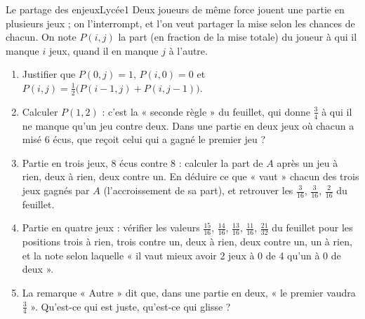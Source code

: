 \documentclass[11pt,a4paper]{article}
\begin{document}
\begin{exercice}{Le partage des enjeux}{Lycée}{1}
Deux joueurs de même force jouent une partie en plusieurs jeux ; on l'interrompt,
et l'on veut partager la mise selon les chances de chacun. On note $P(i,j)$ la
part (en fraction de la mise totale) du joueur à qui il manque $i$ jeux, quand il
en manque $j$ à l'autre.
\begin{enumerate}
\item Justifier que $P(0,j) = 1$, $P(i,0) = 0$ et
  $P(i,j) = \frac12\bigl(P(i-1,j) + P(i,j-1)\bigr)$.
\item Calculer $P(1,2)$ : c'est la « seconde règle » du feuillet, qui donne
  $\frac34$ à qui il ne manque qu'un jeu contre deux. Dans une partie en deux jeux
  où chacun a misé $6$ écus, que reçoit celui qui a gagné le premier jeu ?
\item Partie en trois jeux, $8$ écus contre $8$ : calculer la part de $A$ après
  un jeu à rien, deux à rien, deux contre un. En déduire ce que « vaut » chacun
  des trois jeux gagnés par $A$ (l'accroissement de sa part), et retrouver les
  $\frac{3}{16}$, $\frac{3}{16}$, $\frac{2}{16}$ du feuillet.
\item Partie en quatre jeux : vérifier les valeurs $\frac{15}{16}$, $\frac{14}{16}$,
  $\frac{13}{16}$, $\frac{11}{16}$, $\frac{21}{32}$ du feuillet pour les positions
  trois à rien, trois contre un, deux à rien, deux contre un, un à rien, et la
  note selon laquelle « il vaut mieux avoir 2 jeux à 0 de 4 qu'un à 0 de deux ».
\item La remarque « Autre » dit que, dans une partie en deux, « le premier vaudra
  $\frac34$ ». Qu'est-ce qui est juste, qu'est-ce qui glisse ?
\end{enumerate}
\end{exercice}
\end{document}
